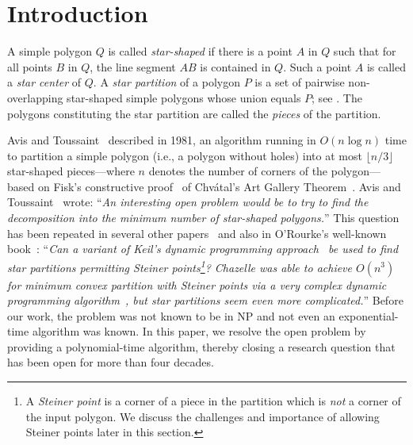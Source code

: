 \documentclass[10pt,a4paper]{article}
\begin{document}






\section{Introduction}\label{sec:intro}

A simple polygon $Q$ is called \emph{star-shaped} if there is a point $A$ in $Q$ such that for all points $B$ in $Q$, the line segment $AB$ is contained in $Q$.
Such a point $A$ is called a \emph{star center} of $Q$.
A \emph{star partition} of a polygon $P$ is a set of pairwise non-overlapping star-shaped simple polygons whose union equals $P$; see .
The polygons constituting the star partition are called the \emph{pieces} of the partition.

Avis and Toussaint~\cite{DBLP:journals/pr/AvisT81} described in 1981, an algorithm running in $O(n\log n)$ time to partition a simple polygon (i.e., a polygon without holes) into at most $\lfloor n/3\rfloor$ star-shaped pieces---where $n$ denotes the number of corners of the polygon---based on Fisk's constructive proof~\cite{DBLP:journals/jct/Fisk78a} of Chv\'{a}tal's Art Gallery Theorem~\cite{chvatal1975combinatorial}.
Avis and Toussaint~\cite{DBLP:journals/pr/AvisT81} wrote: ``\emph{An interesting open problem would be to try to find the decomposition into the minimum number of star-shaped polygons.}''
This question has been repeated in several other papers~\cite{toussaint1982computational,DBLP:journals/tit/ORourkeS83,DBLP:journals/siamcomp/Keil85,DBLP:journals/pieee/Shermer92} and also in O'Rourke's well-known book~\cite{o1987art}: ``\emph{Can a variant of Keil's dynamic programming approach~\cite{DBLP:journals/siamcomp/Keil85} be used to find star partitions permitting Steiner points\footnote{\label{footnote:steiner-points}A \emph{Steiner point} is a corner of a piece in the partition which is \emph{not} a corner of the input polygon. We discuss the challenges and importance of allowing Steiner points later in this section.}? Chazelle was able to achieve $O(n^3)$ for minimum convex partition with Steiner points via a very complex dynamic programming algorithm~\cite{chazelle1980computational}, but star partitions seem even more complicated.}''
Before our work, the problem was not known to be in \textsf{NP} and not even an exponential-time algorithm was known.
In this paper, we resolve the open problem by providing a polynomial-time algorithm,
thereby closing a research question that has been open for more than four decades.
\end{document}
